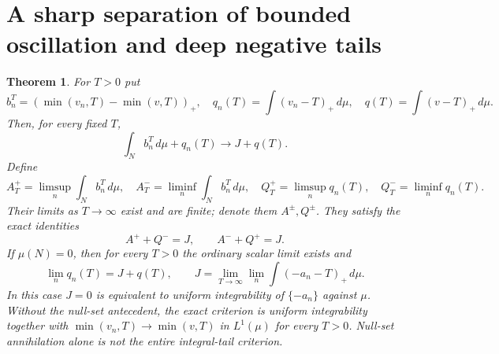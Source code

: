\documentclass[11pt]{article}
\newtheorem{theorem}{Theorem}
\begin{document}
\section{A sharp separation of bounded oscillation and deep negative tails}
\begin{theorem}\label{fresh:two-defects}
For $T>0$ put
\[
 b_n^T=(\min(v_n,T)-\min(v,T))_+,\quad
 q_n(T)=\int(v_n-T)_+\,d\mu,\quad
 q(T)=\int(v-T)_+\,d\mu.
\]
Then, for every fixed $T$,
\begin{equation}\label{fresh:sum}
 \int_N b_n^T\,d\mu+q_n(T)\longrightarrow J+q(T).
\end{equation}
Define
\[
 A_T^+=\limsup_n\int_N b_n^T\,d\mu,\quad
 A_T^-=\liminf_n\int_N b_n^T\,d\mu,\quad
 Q_T^+=\limsup_n q_n(T),\quad Q_T^-=\liminf_n q_n(T).
\]
Their limits as $T\to\infty$ exist and are finite; denote them
$A^\pm,Q^\pm$. They satisfy the exact identities
\[
 A^++Q^-=J,\qquad A^-+Q^+=J.
\]
If $\mu(N)=0$, then for every $T>0$ the ordinary scalar limit exists and
\begin{equation}\label{fresh:pure-tail}
 \lim_n q_n(T)=J+q(T),\qquad
 J=\lim_{T\to\infty}\lim_n\int(-a_n-T)_+\,d\mu.
\end{equation}
In this case $J=0$ is equivalent to uniform integrability of
$\{-a_n\}$ against $\mu$. Without the null-set antecedent, the exact
criterion is uniform integrability together with
$\min(v_n,T)\to\min(v,T)$ in $L^1(\mu)$ for every $T>0$.
Null-set annihilation alone is not the entire integral-tail criterion.
\end{theorem}
\end{document}
